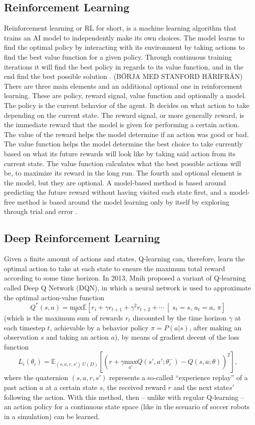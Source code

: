 \subsection{Reinforcement Learning}
Reinforcement learning or RL for short, is a machine learning algorithm that trains an AI model to independently make its own choices. The model learns to find the optimal policy by interacting with its environment by taking actions to find the best value function for a given policy. Through continuous training iterations it will find the best policy in regards to its value function, and in the end find the best possible solution \cite{ieeeRL1}. (BÖRJA MED STANFORD HÄRIFRÅN)
There are three main elements and an additional optional one in reinforcement learning. These are policy, reward signal, value function and optionally a model. The policy is the current behavior of the agent. It decides on what action to take depending on the current state. The reward signal, or more generally reward, is the immediate reward that the model is given for performing a certain action. The value of the reward helps the model determine if an action was good or bad. The value function helps the model determine the best choice to take currently based on what its future rewards will look like by taking said action from its current state. The value function calculates what the best possible actions will be, to maximize its reward in the long run. The fourth and optional element is the model, but they are optional. A model-based method is based around predicting the future reward without having visited each state first, and a model-free method is based around the model learning only by itself by exploring through trial and error \cite{SuttonBartoRL2}.

\subsection{Deep Reinforcement Learning}
Given a finite amount of actions and states, Q-learning can, therefore, learn the optimal action to take at each state to ensure the maximum total reward according to some time horizon. In 2013, Mnih\cite{DQN} proposed a variant of Q-learning called Deep Q Network (DQN), in which a neural network is used to approximate the optimal action-value function
\[
    Q^*(s,a)=\underset \pi {\text{max}} \mathbb{E}\left[ r_i+\gamma r_{t+1}+\gamma^2 r_{t+2}+\cdots \,\middle|\, s_t=s,\,a_t=a,\,\pi \right]
\]
(which is the maximum sum of rewards \(r_t\) discounted by the time horizon \(\gamma\) at each timestep \(t\), achievable by a behavior policy \(\pi=P(a|s)\), after making an observation \(s\) and taking an action \(a\)), by means of gradient decent of the loss function
\[
L_i(\theta_i)=\mathbb{E}_{(s,a,r,s')~U(D)}\left[\left(r+ \gamma \underset {a'} {\text{max}} Q(s',a';\theta^-_i)-Q(s,a;\theta)\right)^2\right]
,\]
where the quaternion \((s,a,r,s')\) represents a so-called ``experience replay'' of a past action \(a\) at a certain state \(s\), the received reward \(r\) and the next state\(s'\) following the action. With this method, then -- unlike with regular Q-learning -- an action policy for a continuous state space (like in the scenario of soccer robots in a simulation) can be learned.

